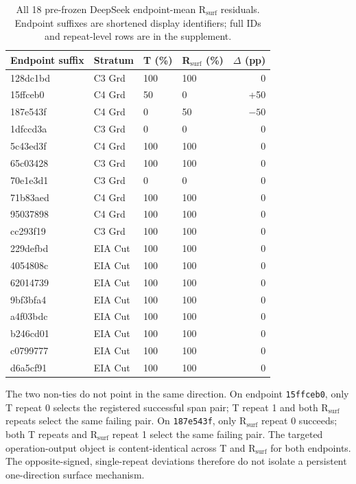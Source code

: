 \begin{table}[ht]
\centering
\scriptsize
\setlength{\tabcolsep}{3pt}
\begin{tabular}{llllr}
\toprule
Endpoint suffix & Stratum & T (\%) & R$_{\mathrm{surf}}$ (\%) & $\Delta$ (pp) \\
\midrule
128dc1bd & C3 Grd & 100 & 100 & 0 \\
15ffceb0 & C4 Grd & 50 & 0 & +50 \\
187e543f & C4 Grd & 0 & 50 & $-50$ \\
1dfccd3a & C3 Grd & 0 & 0 & 0 \\
5c43ed3f & C4 Grd & 100 & 100 & 0 \\
65c03428 & C3 Grd & 100 & 100 & 0 \\
70e1e3d1 & C3 Grd & 0 & 0 & 0 \\
71b83aed & C4 Grd & 100 & 100 & 0 \\
95037898 & C4 Grd & 100 & 100 & 0 \\
cc293f19 & C3 Grd & 100 & 100 & 0 \\
229defbd & EIA Cut & 100 & 100 & 0 \\
4054808c & EIA Cut & 100 & 100 & 0 \\
62014739 & EIA Cut & 100 & 100 & 0 \\
9bf3bfa4 & EIA Cut & 100 & 100 & 0 \\
a4f03bdc & EIA Cut & 100 & 100 & 0 \\
b246cd01 & EIA Cut & 100 & 100 & 0 \\
c0799777 & EIA Cut & 100 & 100 & 0 \\
d6a5cf91 & EIA Cut & 100 & 100 & 0 \\
\bottomrule
\end{tabular}
\caption{All 18 pre-frozen DeepSeek endpoint-mean R$_{\mathrm{surf}}$ residuals. Endpoint suffixes are shortened display identifiers; full IDs and repeat-level rows are in the supplement.}
\label{tab:rsurf-residuals}
\end{table}

The two non-ties do not point in the same direction. On endpoint \texttt{15ffceb0}, only T repeat 0 selects the registered successful span pair; T repeat 1 and both R$_{\mathrm{surf}}$ repeats select the same failing pair. On \texttt{187e543f}, only R$_{\mathrm{surf}}$ repeat 0 succeeds; both T repeats and R$_{\mathrm{surf}}$ repeat 1 select the same failing pair. The targeted operation-output object is content-identical across T and R$_{\mathrm{surf}}$ for both endpoints. The opposite-signed, single-repeat deviations therefore do not isolate a persistent one-direction surface mechanism.

